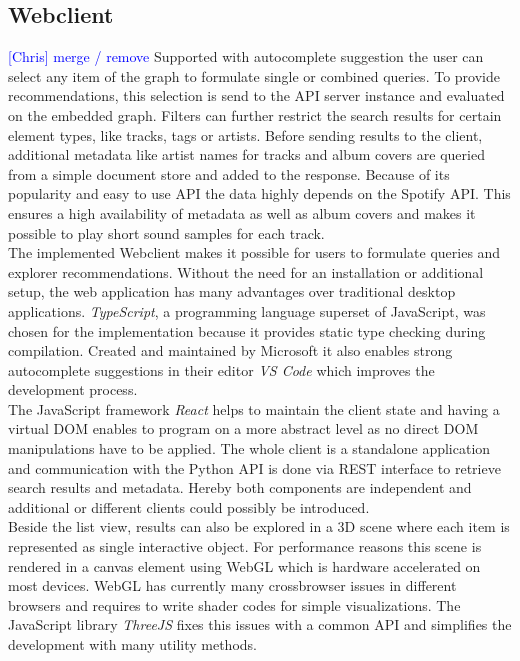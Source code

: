 \documentclass[sigconf]{acmart}
\newcommand{\ce}[1]{\textcolor{blue}{[Chris] #1}}
\newcommand{\ce}[1]{}
\begin{document}
\subsection{Webclient}
\ce{merge / remove}
Supported with autocomplete suggestion the user can select any item of the graph to formulate single or combined queries. To provide recommendations, this selection is send to the API server instance and evaluated on the embedded graph. Filters can further restrict the search results for certain element types, like tracks, tags or artists. Before sending results to the client, additional metadata like artist names for tracks and album covers are queried from a simple document store and added to the response. Because of its popularity and easy to use API the data highly depends on the Spotify API. This ensures a high availability of metadata as well as album covers and makes it possible to play short sound samples for each track.\\



The implemented Webclient makes it possible for users to formulate queries and explorer recommendations. Without the need for an installation or additional setup, the web application has many advantages over traditional desktop applications. \emph{TypeScript}, a programming language superset of JavaScript, was chosen for the implementation because it provides static type checking during compilation. Created and maintained by Microsoft it also enables strong autocomplete suggestions in their editor \emph{VS Code} which improves the development process. \\
The JavaScript framework \emph{React} helps to maintain the client state and having a virtual DOM enables to program on a more abstract level as no direct DOM manipulations have to be applied. The whole client is a standalone application and communication with the Python API is done via REST interface to retrieve search results and metadata. Hereby both components are independent and additional or different clients could possibly be introduced. \\

Beside the list view, results can also be explored in a 3D scene where each item is represented as single interactive object. For performance reasons this scene is rendered in a canvas element using WebGL which is hardware accelerated on most devices. WebGL has currently many crossbrowser issues in different browsers and requires to write shader codes for simple visualizations. The JavaScript library \emph{ThreeJS} fixes this issues with a common API and simplifies the development with many utility methods.
\end{document}
